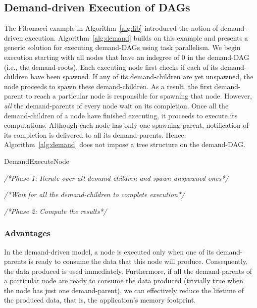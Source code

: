 \documentclass[10pt,conference]{IEEEtran}
\begin{document}
\subsection{Demand-driven Execution of DAGs} 
The Fibonacci example in Algorithm~\ref{alg:fib} introduced the notion of
demand-driven execution. Algorithm~\ref{alg:demand} builds on this example and
presents a generic solution for executing demand-DAGs using task parallelism.
%
We begin execution starting with all nodes that have an indegree of $0$ in the
demand-DAG (i.e., the demand-roots). Each executing node first checks if each
of its demand-children have been spawned. If any of its demand-children are yet
unspawned, the node proceeds to spawn these demand-children. As a result, the
first demand-parent to reach a particular node is responsible for spawning that
node.  However, \emph{all} the demand-parents of every node wait on its
completion. Once all the demand-children of a node have finished executing, it
proceeds to execute its computations. Although each node has only one spawning
parent, notification of its completion is delivered to all its demand-parents.
Hence, Algorithm~\ref{alg:demand} does not impose a tree structure on the
demand-DAG.
%
\begin{algorithm}[t]


\caption{DemandExecuteNode}
\label{alg:demand}


\emph{/*Phase 1: Iterate over all demand-children and spawn unspawned ones*/}\;

\emph{/*Wait for all the demand-children to complete execution*/}\;

\emph{/*Phase 2: Compute the results*/}\;
 \;
\end{algorithm}

\subsubsection{Advantages}
In the demand-driven model, a node is executed only when one of its
demand-parents is ready to consume the data that this node will produce.
Consequently, the data produced is used immediately. Furthermore, if all the
demand-parents of a particular node are ready to consume the data produced
(trivially true when the node has just one demand-parent), we can effectively
reduce the lifetime of the produced data, that is, the application's memory
footprint.
 
\end{document}

